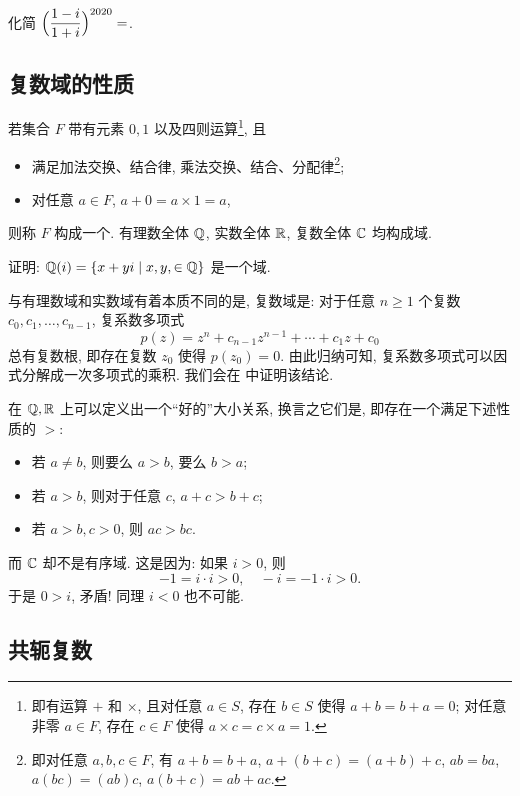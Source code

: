 \begin{exercise}
  化简 $\Bigl(\dfrac{1-i}{1+i}\Bigr)^{2020}=$\fillblank{}.
\end{exercise}

\subsection{复数域的性质\optional}
\label{ssec:complex-field}

若集合 $F$ 带有元素 $0,1$ 以及四则运算\footnote{%
  即有运算 $+$ 和 $\times$, 且对任意 $a\in S$, 存在 $b\in S$ 使得 $a+b=b+a=0$; 对任意非零 $a\in F$, 存在 $c\in F$ 使得 $a\times c=c\times a=1$.%
}, 且
\begin{itemize}
  \item 满足加法交换、结合律, 乘法交换、结合、分配律\footnote{即对任意 $a,b,c\in F$, 有 $a+b=b+a$, $a+(b+c)=(a+b)+c$, $ab=ba$, $a(bc)=(ab)c$, $a(b+c)=ab+ac$.};
  \item 对任意 $a\in F$, $a+0=a\times 1=a$,
\end{itemize}
则称 $F$ 构成一个.
有理数全体 ${\mathbb{Q}}$, 实数全体 ${\mathbb{R}}$, 复数全体 ${\mathbb{C}}$ 均构成域.

\begin{exercise}
  证明: ${\mathbb{Q}}(i)=\{x+yi\mid x,y,\in{\mathbb{Q}}\}$ 是一个域.
\end{exercise}

与有理数域和实数域有着本质不同的是, 复数域是:
对于任意 $n\ge 1$ 个复数 $c_0,c_1,\dots,c_{n-1}$, 复系数多项式
\[
  p(z)=z^n+c_{n-1}z^{n-1}+\cdots+c_1z+c_0
\]
总有复数根, 即存在复数 $z_0$ 使得 $p(z_0)=0$.
由此归纳可知, 复系数多项式可以因式分解成一次多项式的乘积.
我们会在 中证明该结论.

在 ${\mathbb{Q}},{\mathbb{R}}$ 上可以定义出一个``好的''大小关系, 换言之它们是, 即存在一个满足下述性质的 $>$:
\begin{itemize}
  \item 若 $a\neq b$, 则要么 $a>b$, 要么 $b>a$;
  \item 若 $a>b$, 则对于任意 $c$, $a+c>b+c$;
  \item 若 $a>b,c>0$, 则 $ac>bc$.
\end{itemize}
而 \alert{${\mathbb{C}}$ 却不是有序域}.
这是因为: 如果 $i>0$, 则
\[
  -1=i\cdot i>0,\quad -i=-1\cdot i>0.
\]
于是 $0>i$, 矛盾! 同理 $i<0$ 也不可能.


\subsection{共轭复数}

